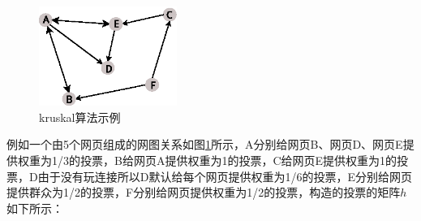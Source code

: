 \begin{figure}[htbp]
\centering
\includegraphics[width=0.4\textwidth]{myfigures/pagerank}
\caption{kruskal算法示例}\label{fig:pagerank}
\vspace{\baselineskip}
\end{figure}

例如一个由5个网页组成的网图关系如图\ref{fig:pagerank}所示，A分别给网页B、网页D、网页E提供权重为1/3的投票，B给网页A提供权重为1的投票，C给网页E提供权重为1的投票，D由于没有玩连接所以D默认给每个网页提供权重为1/6的投票，E分别给网页提供群众为1/2的投票，F分别给网页提供权重为1/2的投票，构造的投票的矩阵$h$如下所示：
